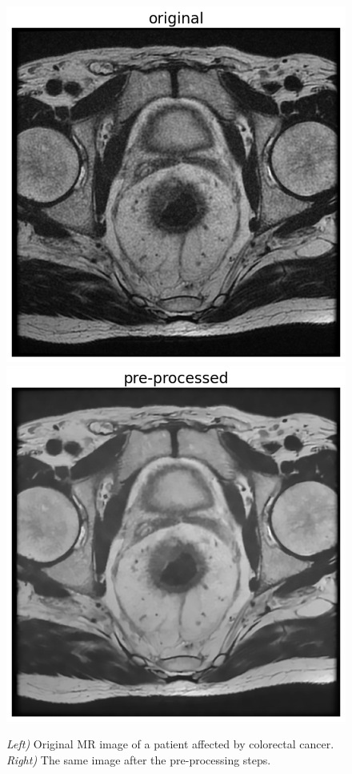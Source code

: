 \documentclass{standalone}
\begin{document}
\begin{figure}[htp]

    \centering
    \includegraphics[width=.49\textwidth]{../images/noisy.png}
    \includegraphics[width=.49\textwidth]{../images/finalimage.png}
    
    \caption{ \textit{ Left)} Original MR image of a patient affected by colorectal cancer.\textit{ Right)} The same image after the pre-processing steps.}
    \label{noisyfinal}
    
    \end{figure}
\end{document}
